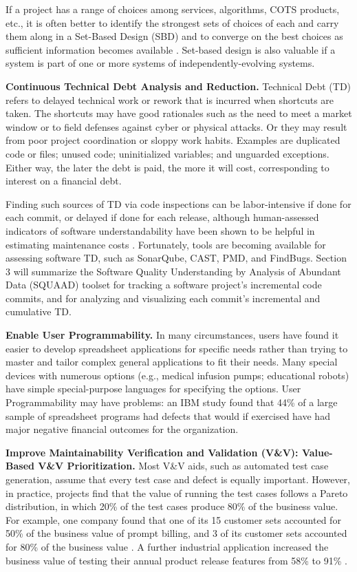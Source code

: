 If a project has a range of choices among services, algorithms, COTS products, etc., it is often better to identify the strongest sets of choices of each and carry them along in a Set-Based Design (SBD) and to converge on the best choices as sufficient information becomes available 
\cite{bernstein1998design,reinertsten2009principles}.  Set-based design is also valuable if a system is part of one or more systems of independently-evolving systems.

\textbf{Continuous Technical Debt Analysis and Reduction.}  Technical Debt (TD) refers to delayed technical work or rework that is incurred when shortcuts are taken.  The shortcuts may have good rationales such as the need to meet a market window or to field defenses against cyber or physical attacks.  Or they may result from poor project coordination or sloppy work habits.  Examples are duplicated code or files; unused code; uninitialized variables; and unguarded exceptions.  Either way, the later the debt is paid, the more it will cost, corresponding to interest on a financial debt.

Finding such sources of TD via code inspections can be labor-intensive if done for each commit, or delayed if done for each release, although human-assessed indicators of software understandability have been shown to be helpful in estimating maintenance costs \cite{chen2016evaluating}.  Fortunately, tools are becoming available for assessing software TD, such as SonarQube, CAST, PMD, and FindBugs.  Section 3 will summarize the Software Quality Understanding by Analysis of Abundant Data (SQUAAD) toolset for tracking a software project's incremental code commits, and for analyzing and visualizing each commit's incremental and cumulative TD.

\textbf{Enable User Programmability.} In many circumstances, users have found it easier to develop spreadsheet applications for specific needs rather than trying to master and tailor complex general applications to fit their needs.   Many special devices with numerous options (e.g., medical infusion pumps; educational robots) have simple special-purpose languages for specifying the options.  User Programmability may have problems: an IBM study found that 44\% of a large sample of spreadsheet programs had defects that would if exercised have had major negative financial outcomes for the organization.

\textbf{Improve Maintainability Verification and Validation (V\&V): Value-Based V\&V Prioritization.}  Most V\&V aids, such as automated test case generation, assume that every test case and defect is equally important.  However, in practice, projects find that the value of running the test cases follows a Pareto distribution, in which 20\% of the test cases produce 80\% of the business value.  For example, one company found that one of its 15 customer sets accounted for 50\% of the business value of prompt billing, and 3 of its customer sets accounted for 80\% of the business value \cite{bullock2000calculating}.   A further industrial application increased the business value of testing their annual product release features from 58\% to 91\% \cite{li2012value}.

